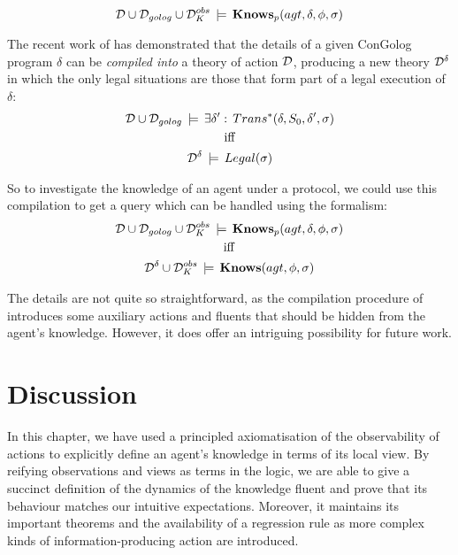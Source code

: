 \[
\mathcal{D}\cup\mathcal{D}_{golog}\cup\mathcal{D}_{K}^{obs}\,\models\,\mathbf{Knows}_{p}(agt,\delta,\phi,\sigma)\]


The recent work of \citet{fritz08congolog_sin_trans} has demonstrated
that the details of a given ConGolog program $\delta$ can be \emph{compiled
into} a theory of action $\mathcal{D}$, producing a new theory $\mathcal{D}^{\delta}$
in which the only legal situations are those that form part of a legal
execution of $\delta$:\begin{gather*}
\mathcal{D}\cup\mathcal{D}_{golog}\,\models\,\exists\delta':\, Trans^{*}(\delta,S_{0},\delta',\sigma)\\
\mathrm{iff}\\
\mathcal{D}^{\delta}\,\models\, Legal(\sigma)\end{gather*}


So to investigate the knowledge of an agent under a protocol, we could
use this compilation to get a query which can be handled using the
formalism:\begin{gather*}
\mathcal{D}\cup\mathcal{D}_{golog}\cup\mathcal{D}_{K}^{obs}\,\models\,\mathbf{Knows}_{p}(agt,\delta,\phi,\sigma)\\
\mathrm{iff}\\
\mathcal{D}^{\delta}\cup\mathcal{D}_{K}^{obs}\,\models\,\mathbf{Knows}(agt,\phi,\sigma)\end{gather*}


The details are not quite so straightforward, as the compilation procedure
of \citep{fritz08congolog_sin_trans} introduces some auxiliary actions
and fluents that should be hidden from the agent's knowledge. However,
it does offer an intriguing possibility for future work.


\section{Discussion\label{sec:Knowledge:Discussion}}

In this chapter, we have used a principled axiomatisation of the observability
of actions to explicitly define an agent's knowledge in terms of its
local view. By reifying observations and views as terms in the logic,
we are able to give a succinct definition of the dynamics of the knowledge
fluent and prove that its behaviour matches our intuitive expectations.
Moreover, it maintains its important theorems and the availability
of a regression rule as more complex kinds of information-producing
action are introduced.

